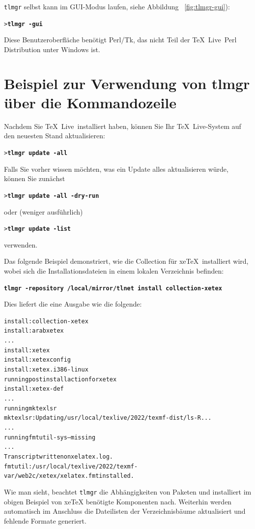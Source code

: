 \documentclass[12pt,ngerman,a4paper,fullparskip]{scrreprt}
\newcommand{\TL}{\TeX\ Live\xspace}
\newcommand{\prog}[1]{\texttt{#1}}
\newcommand{\Ucom}[1]{\textbf{\texttt{#1}}}
\providecommand*{\XeTeX}{xe\TeX\xspace}
\begin{document}
\prog{tlmgr} selbst kann im GUI-Modus laufen, siehe Abbildung
~\ref{fig:tlmgr-gui}):

\begin{alltt}
> \Ucom{tlmgr -gui}
\end{alltt}

Diese Benutzeroberfläche benötigt Perl/Tk, das nicht Teil der \TL\ Perl Distribution unter Windows ist.

\section{Beispiel zur Verwendung von tlmgr über die Kommandozeile}


Nachdem Sie \TL\ installiert haben, können Sie Ihr \TL-System auf den
neuesten Stand aktualisieren:
\begin{alltt}
> \Ucom{tlmgr update -all}
\end{alltt}
Falls Sie vorher wissen möchten, was ein Update alles aktualisieren würde, können Sie zunächst
\begin{alltt}
> \Ucom{tlmgr update -all -dry-run}
\end{alltt}
oder (weniger ausführlich)
\begin{alltt}
> \Ucom{tlmgr update -list}
\end{alltt}
verwenden.

Das folgende Beispiel demonstriert, wie die Collection für \XeTeX\ installiert
wird, wobei sich die Installationsdateien in einem lokalen Verzeichnis
befinden:
 
\begin{alltt}
\Ucom{tlmgr -repository /local/mirror/tlnet install collection-xetex}
\end{alltt}
Dies liefert die eine  Ausgabe wie die folgende:

\begin{alltt}\small
install: collection-xetex
install: arabxetex
...
install: xetex
install: xetexconfig
install: xetex.i386-linux
running post install action for xetex
install: xetex-def
...
running mktexlsr
mktexlsr: Updating /usr/local/texlive/2022/texmf-dist/ls-R...
...
running fmtutil-sys --missing
...
Transcript written on xelatex.log.
fmtutil: /usr/local/texlive/2022/texmf-var/web2c/xetex/xelatex.fmt installed.
\end{alltt}

Wie man sieht, beachtet \prog{tlmgr} die Abhängigkeiten von Paketen und installiert im obigen Beispiel von \XeTeX{} benötigte Komponenten nach. Weiterhin werden automatisch im Anschluss die Dateilisten der Verzeichnisbäume aktualisiert und fehlende Formate generiert.
\end{document}
